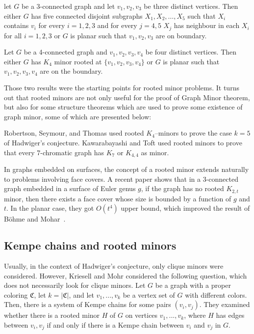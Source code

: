 \begin{thm}
 let $G$ be a 3-connected graph and let $v_1, v_2, v_3$ be three distinct vertices. Then either $G$ has 
 five connected disjoint subgraphs $X_1, X_2, \dots, X_5$ such that $X_i$ contains $v_i$ for every $i = 1,2,3$
 and for every $j = 4,5$ $X_j$ has neighbour in each $X_i$ for all $i = 1,2,3$ or $G$ is planar such that $v_1, v_2, v_3$ are on boundary.
\end{thm}

\begin{thm}
 Let $G$ be a 4-connected graph and $v_1, v_2, v_3, v_4$ be four distinct vertices. Then either $G$ has $K_4$ minor rooted
 at $\{v_1, v_2, v_3, v_4\}$ or $G$ is planar such that $v_1, v_2, v_3, v_4$ are on the boundary.
\end{thm}

Those two results were the starting points for rooted minor problems. 
\newline
It turns out that rooted minors are not only
useful for the proof of Graph Minor theorem, but also for some structure theorems which are used to prove some existence
of graph minor, some of which are presented below:

Robertson, Seymour, and Thomas \cite{robertson_seymour_1993} used rooted $K_4$–minors to prove the case $k=5$ of Hadwiger's conjecture.
Kawarabayashi and Toft \cite{Kawarabayashi2005} used rooted minors to prove that every 7-chromatic graph has $K_7$ or $K_{4,4}$ as minor.

In graphs embedded on surfaces, the concept of a rooted minor extends naturally to problems involving
face covers. A recent paper \cite{Fiorini2025} shows that in a 3-connected
graph embedded in a surface of Euler genus $g$, if the graph has no rooted $K_{2,t}$ minor,
then there exists a face cover whose size is bounded by a function of $g$ and $t$. 
In the planar case, they got $O(t^4)$ upper bound, which improved the result of Böhme and Mohar~\cite{BOHME2002291}.

\subsection*{Kempe chains and rooted minors}
Usually, in the context of Hadwiger's conjecture, only clique minors were considered. However, Kriesell and Mohr \cite{matthias_2022} considered
the following question, which does not necessarily look for clique minors. Let $G$ be a graph with a proper coloring
$\mathfrak{C}$, let $k = |\mathfrak{C}|$, and let $v_1, ..., v_{k}$ be a vertex set of $G$ with different colors.
Then, there is a system of Kempe chains for some pairs $(v_i, v_j)$.
They examined whether there is a rooted minor $H$ of $G$ on vertices $v_1, ..., v_{k}$, where $H$ has edges between 
$v_i, v_j$ if and only if there is a Kempe chain between $v_i$ and $v_j$ in $G$.

